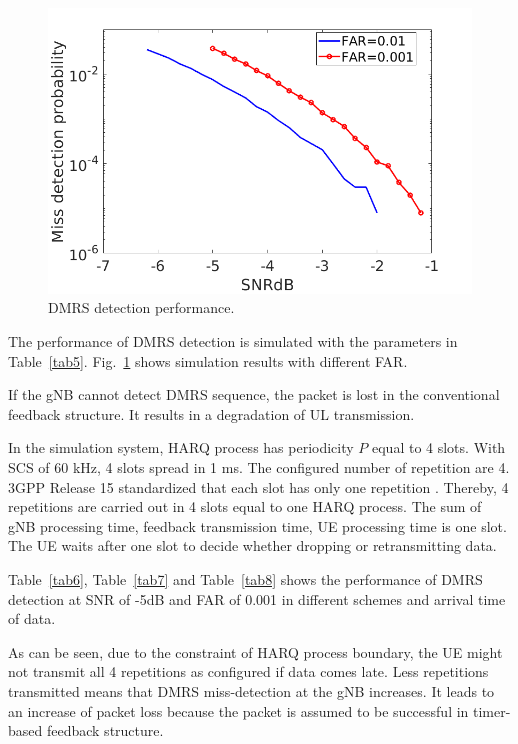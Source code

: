 \documentclass{ieeeaccess}
\begin{document}
\begin{figure}[htbp]
\centerline{\includegraphics[scale=0.22]{fig15.png}}
\caption{DMRS detection performance.}
\vspace{-2mm}
\label{fig15}

\end{figure}

The performance of DMRS detection is simulated with the parameters in Table~\ref{tab5}. Fig.~\ref{fig15} shows simulation results with different FAR. 

If the gNB cannot detect DMRS sequence, the packet is lost in the conventional feedback structure. It results in a degradation of UL transmission.

In the simulation system, HARQ process has periodicity $P$ equal to 4 slots. With SCS of 60 kHz, 4 slots spread in 1 ms. The configured number of repetition are 4. 3GPP Release 15 standardized that each slot has only one repetition \cite{ref3}. Thereby, 4 repetitions are carried out in 4 slots equal to one HARQ process. The sum of gNB processing time, feedback transmission time, UE processing time is one slot. The UE waits after one slot to decide whether dropping or retransmitting data.

Table~\ref{tab6}, Table~\ref{tab7} and Table~\ref{tab8} shows the performance of DMRS detection at SNR of -5dB and FAR of 0.001 in different schemes and arrival time of data. 

As can be seen, due to the constraint of HARQ process boundary, the UE might not transmit all 4 repetitions as configured if data comes late. Less repetitions transmitted means that DMRS miss-detection at the gNB increases. It leads to an increase of packet loss because the packet is assumed to be successful in timer-based feedback structure.
\end{document}
